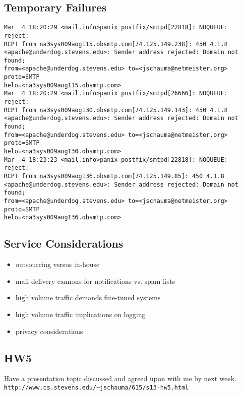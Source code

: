 \documentclass[xga]{xdvislides}
\begin{document}
\subsection{Temporary Failures}
\begin{verbatim}
Mar  4 18:20:29 <mail.info>panix postfix/smtpd[22818]: NOQUEUE: reject:
RCPT from na3sys009aog115.obsmtp.com[74.125.149.238]: 450 4.1.8
<apache@underdog.stevens.edu>: Sender address rejected: Domain not found;
from=<apache@underdog.stevens.edu> to=<jschauma@netmeister.org> proto=SMTP
helo=<na3sys009aog115.obsmtp.com>
Mar  4 18:20:29 <mail.info>panix postfix/smtpd[26666]: NOQUEUE: reject:
RCPT from na3sys009aog130.obsmtp.com[74.125.149.143]: 450 4.1.8
<apache@underdog.stevens.edu>: Sender address rejected: Domain not found;
from=<apache@underdog.stevens.edu> to=<jschauma@netmeister.org> proto=SMTP
helo=<na3sys009aog130.obsmtp.com>
Mar  4 18:23:23 <mail.info>panix postfix/smtpd[22818]: NOQUEUE: reject:
RCPT from na3sys009aog136.obsmtp.com[74.125.149.85]: 450 4.1.8
<apache@underdog.stevens.edu>: Sender address rejected: Domain not found;
from=<apache@underdog.stevens.edu> to=<jschauma@netmeister.org> proto=SMTP
helo=<na3sys009aog136.obsmtp.com>
\end{verbatim}

\subsection{Service Considerations}

\begin{itemize}
	\item outsourcing versus in-house
	\item mail delivery cannons for notifications vs. spam lists
	\item high volume traffic demands fine-tuned systems
	\item high volume traffic implications on logging
	\item privacy considerations
\end{itemize}

\subsection{HW5}

Have a presentation topic discussed and agreed upon with me by next
week.
\\

\verb+http://www.cs.stevens.edu/~jschauma/615/s13-hw5.html+
\end{document}
